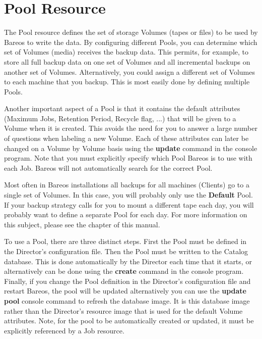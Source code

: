 \section{Pool Resource}
\label{PoolResource}

The Pool resource defines the set of storage Volumes (tapes or files) to be
used by Bareos to write the data. By configuring different Pools, you can
determine which set of Volumes (media) receives the backup data. This permits,
for example, to store all full backup data on one set of Volumes and all
incremental backups on another set of Volumes. Alternatively, you could assign
a different set of Volumes to each machine that you backup. This is most
easily done by defining multiple Pools.

Another important aspect of a Pool is that it contains the default attributes
(Maximum Jobs, Retention Period, Recycle flag, ...) that will be given to a
Volume when it is created. This avoids the need for you to answer a large
number of questions when labeling a new Volume. Each of these attributes can
later be changed on a Volume by Volume basis using the {\bf update} command in
the console program. Note that you must explicitly specify which Pool Bareos
is to use with each Job. Bareos will not automatically search for the correct
Pool.

Most often in Bareos installations all backups for all machines (Clients) go
to a single set of Volumes. In this case, you will probably only use the {\bf
Default} Pool. If your backup strategy calls for you to mount a different tape
each day, you will probably want to define a separate Pool for each day. For
more information on this subject, please see the
 chapter of this
manual.

To use a Pool, there are three distinct steps. First the Pool must be defined
in the Director's configuration file. Then the Pool must be written to the
Catalog database. This is done automatically by the Director each time that it
starts, or alternatively can be done using the {\bf create} command in the
console program. Finally, if you change the Pool definition in the Director's
configuration file and restart Bareos, the pool will be updated alternatively
you can use the {\bf update pool} console command to refresh the database
image. It is this database image rather than the Director's resource image
that is used for the default Volume attributes. Note, for the pool to be
automatically created or updated, it must be explicitly referenced by a Job
resource.

